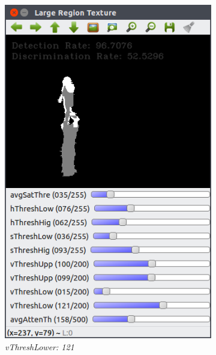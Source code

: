 \documentclass[12pt]{report}
\begin{document}
\begin{figure}
  \centering
  \begin{subfigure}{.48\linewidth}
    \includegraphics[width=1\linewidth]{figures/background/lr_caviar_thresh15.png}
    \caption{\textit{vThreshLower: 121}}
  \end{subfigure}
  \hfill
  \begin{subfigure}{.49\linewidth}

\end{subfigure}
\end{figure}
\end{document}
